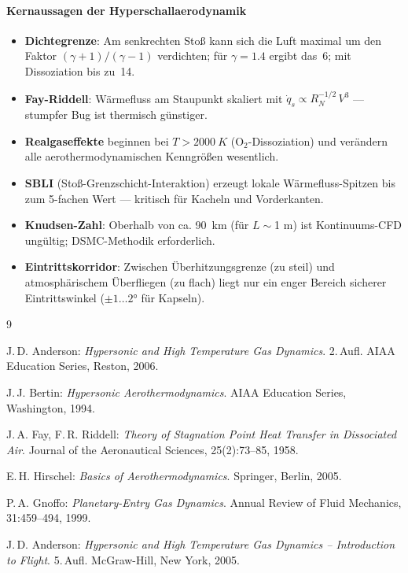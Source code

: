 ﻿\documentclass[12pt,a4paper]{article}
\begin{document}
\paragraph*{Kernaussagen der Hyperschallaerodynamik}
\begin{itemize}[leftmargin=*]
  \item \textbf{Dichtegrenze}: Am senkrechten Stoß kann sich die Luft maximal
    um den Faktor $(\gamma+1)/(\gamma-1)$ verdichten; für $\gamma=1.4$ ergibt
    das~6; mit Dissoziation bis zu~14.
  \item \textbf{Fay-Riddell}: Wärmefluss am Staupunkt skaliert mit
    $\dot{q}_s \propto R_N^{-1/2}\,V^3$ --- stumpfer Bug ist thermisch günstiger.
  \item \textbf{Realgaseffekte} beginnen bei $T > \SI{2000}{K}$ (O$_2$-Dissoziation)
    und verändern alle aerothermodynamischen Kenngrößen wesentlich.
  \item \textbf{SBLI} (Stoß-Grenzschicht-Interaktion) erzeugt lokale
    Wärmefluss-Spitzen bis zum 5-fachen Wert --- kritisch für Kacheln und
    Vorderkanten.
  \item \textbf{Knudsen-Zahl}: Oberhalb von ca. \SI{90}{km} (für $L\sim$1 m)
    ist Kontinuums-CFD ungültig; DSMC-Methodik erforderlich.
  \item \textbf{Eintrittskorridor}: Zwischen Überhitzungsgrenze (zu steil)
    und atmosphärischem Überfliegen (zu flach) liegt nur ein enger Bereich
    sicherer Eintrittswinkel ($\pm 1\ldots2 °$ für Kapseln).
\end{itemize}

\begin{thebibliography}{9}

J.\,D. Anderson:
\textit{Hypersonic and High Temperature Gas Dynamics}.
2.\,Aufl. AIAA Education Series, Reston, 2006.

J.\,J. Bertin:
\textit{Hypersonic Aerothermodynamics}.
AIAA Education Series, Washington, 1994.

J.\,A. Fay, F.\,R. Riddell:
\textit{Theory of Stagnation Point Heat Transfer in Dissociated Air}.
Journal of the Aeronautical Sciences, 25(2):73--85, 1958.

E.\,H. Hirschel:
\textit{Basics of Aerothermodynamics}.
Springer, Berlin, 2005.

P.\,A. Gnoffo:
\textit{Planetary-Entry Gas Dynamics}.
Annual Review of Fluid Mechanics, 31:459--494, 1999.

J.\,D. Anderson:
\textit{Hypersonic and High Temperature Gas Dynamics -- Introduction to Flight}.
5.\,Aufl. McGraw-Hill, New York, 2005.

\end{thebibliography}
\end{document}
